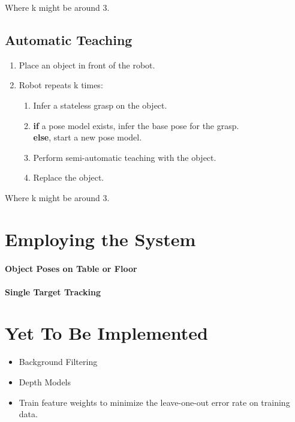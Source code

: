 \documentclass[12pt]{article}
\numberwithin{equation}{section}
\numberwithin{table}{section}
\numberwithin{figure}{section}
\begin{document}
Where k might be around 3.

\subsection{Automatic Teaching}

\begin{enumerate}
  \item Place an object in front of the robot.
  \item Robot repeats k times:
  \begin{enumerate}
    \item Infer a stateless grasp on the object.
    \item \textbf{if} a pose model exists, infer the base pose for the grasp. \\
	  \textbf{else}, start a new pose model.
    \item Perform semi-automatic teaching with the object.
    \item Replace the object.
  \end{enumerate}
\end{enumerate}

Where k might be around 3.

\section{Employing the System}
\paragraph{Object Poses on Table or Floor}
\paragraph{Single Target Tracking}

\section{Yet To Be Implemented}

\begin{itemize}
  \item Background Filtering
  \item Depth Models
  \item Train feature weights to minimize the leave-one-out error rate on training data.
\end{itemize}



\end{document}
